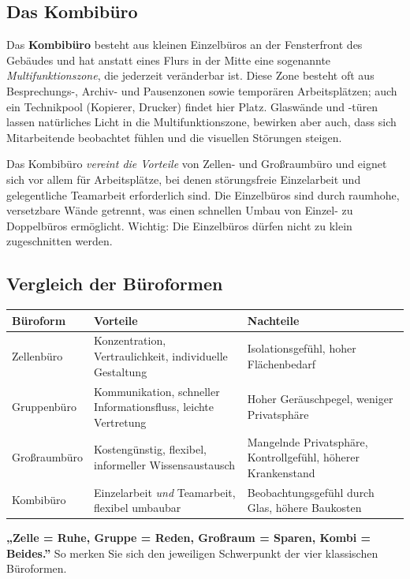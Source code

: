 \documentclass[11pt, a4paper]{article}
\begin{document}
\subsection{Das Kombibüro}

Das \textbf{Kombibüro} besteht aus kleinen Einzelbüros an der Fensterfront des Gebäudes
und hat anstatt eines Flurs in der Mitte eine sogenannte \emph{Multifunktionszone}, die
jederzeit veränderbar ist. Diese Zone besteht oft aus Besprechungs-, Archiv- und
Pausenzonen sowie temporären Arbeitsplätzen; auch ein Technikpool (Kopierer, Drucker)
findet hier Platz. Glaswände und -türen lassen natürliches Licht in die Multifunktions\-zone,
bewirken aber auch, dass sich Mitarbeitende beobachtet fühlen und die visuellen
Störungen steigen.

Das Kombibüro \emph{vereint die Vorteile} von Zellen- und Großraumbüro und eignet sich
vor allem für Arbeitsplätze, bei denen störungsfreie Einzelarbeit und gelegentliche
Teamarbeit erforderlich sind. Die Einzelbüros sind durch raumhohe, versetzbare Wände
getrennt, was einen schnellen Umbau von Einzel- zu Doppelbüros ermöglicht. Wichtig:
Die Einzelbüros dürfen nicht zu klein zugeschnitten werden.

\subsection{Vergleich der Büroformen}

\begin{tabular}{p{2.6cm} p{4.7cm} p{4.7cm}}
\toprule
\textbf{Büroform} & \textbf{Vorteile} & \textbf{Nachteile}\\
\midrule
Zellenbüro & Konzentration, Vertraulichkeit, individuelle Gestaltung & Isolationsgefühl, hoher Flächenbedarf\\
Gruppenbüro & Kommunikation, schneller Informationsfluss, leichte Vertretung & Hoher Geräuschpegel, weniger Privatsphäre\\
Großraumbüro & Kostengünstig, flexibel, informeller Wissensaustausch & Mangelnde Privatsphäre, Kontrollgefühl, höherer Krankenstand\\
Kombibüro & Einzelarbeit \emph{und} Teamarbeit, flexibel umbaubar & Beobachtungsgefühl durch Glas, höhere Baukosten\\
\bottomrule
\end{tabular}

\medskip
\begin{eselsbruecke}
\textbf{„Zelle = Ruhe, Gruppe = Reden, Großraum = Sparen, Kombi = Beides.”}
So merken Sie sich den jeweiligen Schwerpunkt der vier klassischen Büroformen.
\end{eselsbruecke}
\end{document}
